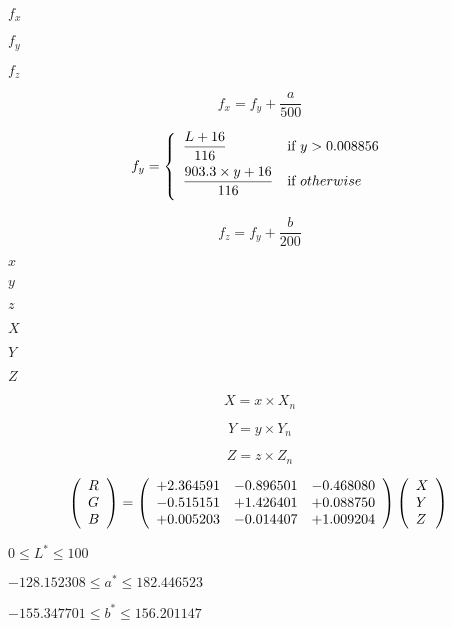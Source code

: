 \documentclass{article}
\begin{document}
$f_{x}$
\pagebreak

$ f_{y}$
\pagebreak

$f_{z}$
\pagebreak

\[ f_{x} = f_{y} + \frac{a}{500} \]
\pagebreak

\[ f_{y}=\left \{ \begin{array}{ll} \dfrac{L + 16}{116} & \mbox{if}\ y > 0.008856 \vspace{.5em} \\ \dfrac{903.3\times y + 16}{116} & \mbox{if}\ otherwise \vspace{.5em} \\ \end{array} \right. \]
\pagebreak

\[ f_{z} = f_{y} + \frac{b}{200} \]
\pagebreak

$x$
\pagebreak

$y$
\pagebreak

$z$
\pagebreak

$X$
\pagebreak

$Y$
\pagebreak

$Z$
\pagebreak

\[ X = x\times X_{n} \]
\pagebreak

\[ Y = y\times Y_{n} \]
\pagebreak

\[ Z = z\times Z_{n} \]
\pagebreak

\[ \left( \begin{array}{l} R \\ G \\ B \\ \end{array} \right) = \left( \begin{array}{lll} +2.364591 & -0.896501 & -0.468080 \\ -0.515151 & +1.426401 & +0.088750 \\ +0.005203 & -0.014407 & +1.009204 \\ \end{array} \right) \left( \begin{array}{l} X \\ Y \\ Z \\ \end{array} \right)\\ \]
\pagebreak

$ 0 \le L^{*} \le 100 $
\pagebreak

$ -128.152308 \le a^{*} \le 182.446523 $
\pagebreak

$ -155.347701 \le b^{*} \le 156.201147 $
\pagebreak
\end{document}

